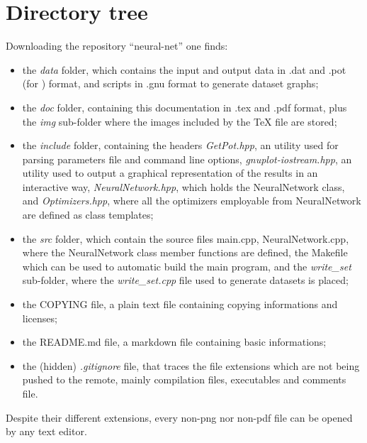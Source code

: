 \documentclass[12pt, a4paper]{report}
\theoremstyle{definition}
\begin{document}
{\section{Directory tree}
Downloading the repository ``neural-net'' one finds:
\begin{itemize}
	\item the \textit{data} folder, which contains the input and output data in .dat and .pot (for \cite{getpot}) format, and \cite{gnuplot} scripts in .gnu format to generate dataset graphs;
	\item the \textit{doc} folder, containing this documentation in .tex and .pdf format, plus the \textit{img} sub-folder where the images included by the TeX file are stored;
	\item the \textit{include} folder, containing the headers \textit{GetPot.hpp}, an utility used for parsing parameters file and command line options, \textit{gnuplot-iostream.hpp}, an utility used to output a graphical representation of the results in an interactive way, \textit{NeuralNetwork.hpp}, which holds the NeuralNetwork class, and \textit{Optimizers.hpp}, where all the optimizers employable from NeuralNetwork are defined as class templates;
	\item the \textit{src} folder, which contain the source files main.cpp, NeuralNetwork.cpp, where the NeuralNetwork class member functions are defined, the Makefile which can be used to automatic build the main program, and the \textit{write\_set} sub-folder, where the \textit{write\_set.cpp} file used to generate datasets is placed;
	\item the COPYING file, a plain text file containing copying informations and licenses;
	\item the README.md file, a markdown file containing basic informations;
	\item the (hidden) \textit{.gitignore} file, that traces the file extensions which are not being pushed to the remote, mainly compilation files, executables and comments file.
\end{itemize}
\noindent Despite their different extensions, every non-png nor non-pdf file can be opened by any text editor.
}
\end{document}
